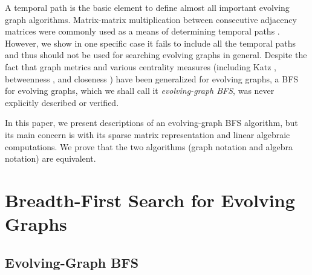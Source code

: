 \documentclass[11pt, conference, , compsocconf]{IEEEtran}
\theoremstyle{definition}
\begin{document}
A temporal path is the basic element to 
 define almost  all important evolving graph algorithms.
Matrix-matrix multiplication between consecutive adjacency matrices
were commonly used as a means of determining temporal paths \cite{gphe11} \cite{grihig13}. However, we show
in one specific case it fails to include all the temporal paths and thus should not be used 
for searching evolving graphs in general.
Despite the fact that graph metrics \cite{ntmm13} \cite{tmml09} \cite{tsmm09} and 
various centrality measures (including Katz  \cite{gphe11} \cite{grihig13}, 
betweenness \cite{alhi15}, and closeness  \cite{tmml10}) 
have been generalized for evolving graphs,
a BFS for evolving graphs, which we shall call it \emph{evolving-graph BFS},
was never explicitly described or verified.


In this paper,  we present descriptions of an evolving-graph BFS algorithm, but its main concern is with its sparse matrix
representation and linear algebraic computations. 
We prove that the two algorithms (graph notation and algebra notation) are equivalent.  



\section{Breadth-First Search for Evolving Graphs}
\label{sec:breadth-first-search}

\subsection{Evolving-Graph BFS}
\label{sec:evolving-graph-bfs}
\end{document}
